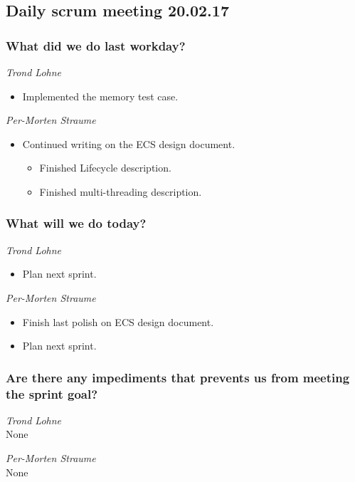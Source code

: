 \documentclass{article}
\begin{document}
\begin{center}
\subsection*{Daily scrum meeting 20.02.17}
\end{center}
\bigskip


\subsubsection*{What did we do last workday?}

\noindent\textit{Trond Lohne}
\begin{itemize}
	\item 
	Implemented the memory test case.
\end{itemize}

\medskip

\noindent\textit{Per-Morten Straume}
\begin{itemize}
	\item 
	Continued writing on the ECS design document.
    \begin{itemize}
        \item
        Finished Lifecycle description.

        \item
        Finished multi-threading description. 
    \end{itemize}
\end{itemize}

\subsubsection*{What will we do today?}

\noindent\textit{Trond Lohne}
\begin{itemize}
	\item 
	Plan next sprint.
\end{itemize}

\medskip

\noindent\textit{Per-Morten Straume}
\begin{itemize}
	\item 
	Finish last polish on ECS design document.
	
	\item 
	Plan next sprint.
\end{itemize}


\subsubsection*{Are there any impediments that prevents us from meeting the sprint goal?}

\noindent\textit{Trond Lohne}\\
None

\medskip

\noindent\textit{Per-Morten Straume}\\
None
\end{document}
